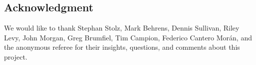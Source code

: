 
\subsection*{Acknowledgment}

We would like to thank Stephan Stolz, Mark Behrens, Dennis Sullivan, Riley Levy, John Morgan, Greg Brumfiel, Tim Campion, Federico Cantero Mor\'an, and the anonymous referee for their insights, questions, and comments about this project.